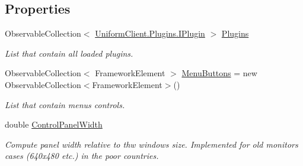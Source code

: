 \subsection*{Properties}
\begin{DoxyCompactItemize}
\item 
Observable\+Collection$<$ \mbox{\hyperlink{interface_uniform_client_1_1_plugins_1_1_i_plugin}{Uniform\+Client.\+Plugins.\+I\+Plugin}} $>$ \mbox{\hyperlink{class_teacher_handbook_1_1_main_window_a86e1ee1d12e39fbbd0bc0d7f32e36ad0}{Plugins}}
\begin{DoxyCompactList}\small\item\em List that contain all loaded plugins. \end{DoxyCompactList}\item 
Observable\+Collection$<$ Framework\+Element $>$ \mbox{\hyperlink{class_teacher_handbook_1_1_main_window_ada9d7a71ad01c470b09f6c62bf2afb7c}{Menu\+Buttons}} = new Observable\+Collection$<$Framework\+Element$>$()
\begin{DoxyCompactList}\small\item\em List that contain menu\textquotesingle{}s controls. \end{DoxyCompactList}\item 
double \mbox{\hyperlink{class_teacher_handbook_1_1_main_window_ad5d35ace4162888ef660d19eb3990626}{Control\+Panel\+Width}}
\begin{DoxyCompactList}\small\item\em Compute panel width relative to thw window\textquotesingle{}s size. Implemented for old monitors\textquotesingle{} cases (640x480 etc.) in the poor countries. \end{DoxyCompactList}\end{DoxyCompactItemize}
